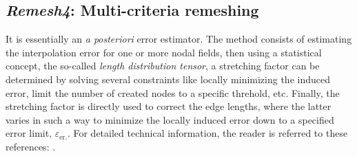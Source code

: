 
\subsection{\emph{Remesh4}: Multi-criteria remeshing}   \label{sec:remesh4_params}

It is essentially an \emph{a posteriori} error estimator. The method consists of estimating the interpolation error for
one or more nodal fields, then using a statistical concept, the so-called \emph{length distribution tensor}, a stretching factor
can be determined by solving several constraints like locally minimizing the induced error, limit the number of created nodes to
a specific  threhold, etc. Finally, the stretching factor is directly used to correct the edge lengths, where the latter varies in such a way to minimize the locally induced error down
to a specified error limit, $\varepsilon_\text{er.}$.
For detailed technical information, the reader is referred to these references: \citep{coupez_metric_2011,coupez_edge-based_2013,el_jannoun_space-time_2014}.

